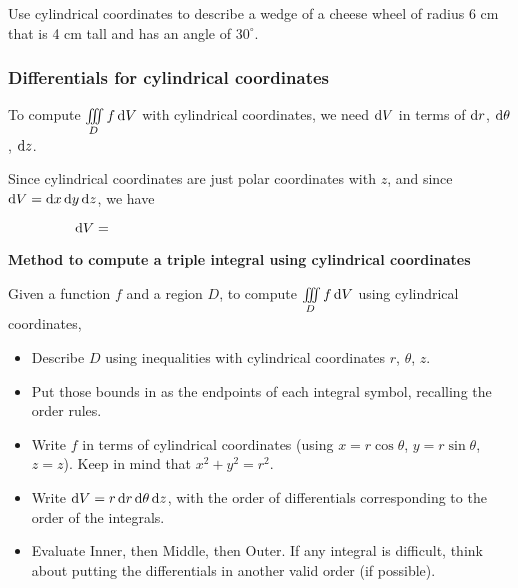 \vfill



\begin{ex}
    Use cylindrical coordinates to describe a wedge of a cheese wheel of radius 6 cm that is 4 cm tall and has an angle of $30^\circ$.
\end{ex}

\vspace{1.5in}

\pagebreak 

\subsubsection{Differentials for cylindrical coordinates}
To compute  $\iiint\limits_D f\mathop{}\!\mathrm{d} V$ with cylindrical coordinates, we need $\mathop{}\!\mathrm{d} V$ in terms of $\mathop{}\!\mathrm{d} r$, $\mathop{}\!\mathrm{d} \theta$, $\mathop{}\!\mathrm{d} z$. \medskip 

\noindent Since cylindrical coordinates are just polar coordinates with $z$, and since $\mathop{}\!\mathrm{d} V=\mathop{}\!\mathrm{d} x\mathop{}\!\mathrm{d} y\mathop{}\!\mathrm{d} z$, we have \bigskip 

\[
    \dV=\phantom{ \dx\dy\dz=r\dr\dtheta\dz.}\hspace{2in}
\] 

\bigskip 

\begin{framed}
    {\centering 
        \textbf{Method to compute a triple integral using cylindrical coordinates}  
    \par}
    \bigskip 
    
    Given a function $f$ and a region $D$, to compute $\iiint\limits_D f\mathop{}\!\mathrm{d} V$ using cylindrical coordinates,
    \begin{itemize}
        \item Describe $D$ using inequalities with cylindrical coordinates $r$, $\theta$, $z$.
        \item Put those bounds in as the endpoints of each integral symbol, recalling the order rules.
        \item Write $f$ in terms of cylindrical coordinates (using $x=r\cos\theta$, $y=r\sin\theta$, $z=z$). Keep in mind that $x^2+y^2=r^2$.
        \item Write $\mathop{}\!\mathrm{d} V = r\mathop{}\!\mathrm{d} r\mathop{}\!\mathrm{d} \theta\mathop{}\!\mathrm{d} z$, with the order of differentials corresponding to the order of the integrals.
        \item Evaluate Inner, then Middle, then Outer. If any integral is difficult, think about putting the differentials in another valid order (if possible).
    \end{itemize} 
\end{framed}

